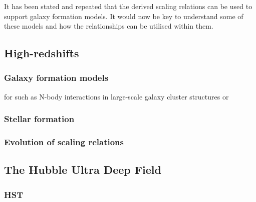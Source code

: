 \documentclass[12pt, twocolumn]{revtex4-1}    %
\begin{document}
It has been stated and repeated that the derived scaling relations can be used to support galaxy formation models. It would now be key to understand some of these models and how the relationships can be utilised within them.    


\vspace{2ex} %
\subsection{High-redshifts}
\subsubsection{Galaxy formation models}
\noindent
for such as N-body interactions in large-scale galaxy cluster structures or 


\vspace{2ex} %
\subsubsection{Stellar formation}
\noindent


\vspace{2ex} %
\subsubsection{Evolution of scaling relations}
\noindent


\vspace{2ex} %
\subsection{The Hubble Ultra Deep Field}
\subsubsection{HST}
\noindent
\end{document}
